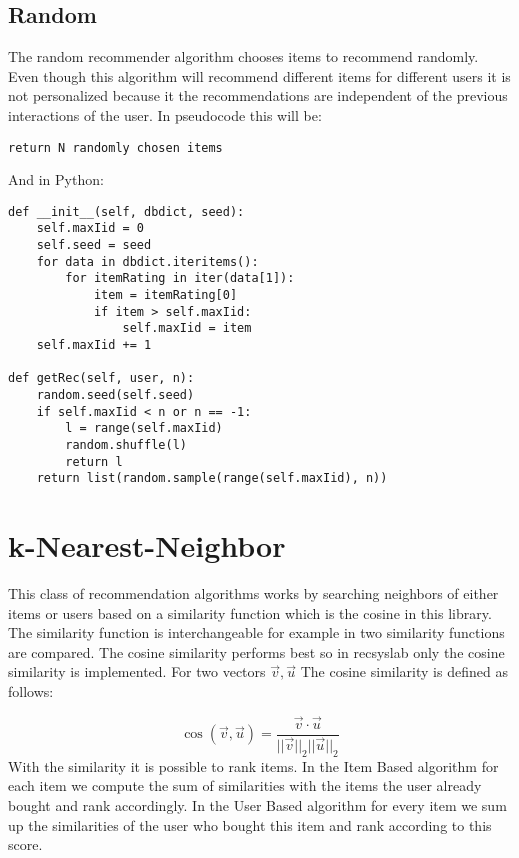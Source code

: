 \subsection{Random}

The random recommender algorithm chooses items to recommend randomly.
Even though this algorithm will recommend different items for different
users it is not personalized because it the recommendations are
independent of the previous interactions of the user.
In pseudocode this will be:
\begin{lstlisting}
return N randomly chosen items
\end{lstlisting}
And in Python:
\begin{lstlisting}
def __init__(self, dbdict, seed):
    self.maxIid = 0
    self.seed = seed
    for data in dbdict.iteritems():
        for itemRating in iter(data[1]):
            item = itemRating[0]
            if item > self.maxIid:
                self.maxIid = item
    self.maxIid += 1

def getRec(self, user, n):
    random.seed(self.seed)
    if self.maxIid < n or n == -1:
        l = range(self.maxIid)
        random.shuffle(l)
        return l
    return list(random.sample(range(self.maxIid), n))
\end{lstlisting}


\section{k-Nearest-Neighbor}

This class of recommendation algorithms works by searching neighbors
of either items or users based on a similarity function which is the
cosine in this library. The similarity function is interchangeable 
for example in
\cite{Karypis:2001:EIT:502585.502627} two similarity functions are
compared. The cosine similarity performs best so in recsyslab only the cosine similarity
is implemented. For two vectors \(\overrightarrow{v},\overrightarrow{u}\)
The cosine similarity is defined as follows:

\begin{equation}
\cos(\overrightarrow{v}, \overrightarrow{u})=\frac{\overrightarrow{v} \cdot \overrightarrow{u}}{||\overrightarrow{v}||_{2} ||\overrightarrow{u}||_{2}}
\end{equation}
With the similarity it is possible to rank items.
In the Item Based algorithm for each item we compute the sum of 
similarities with the items the user already bought and rank 
accordingly.
In the User Based algorithm for every item we sum up the 
similarities of the user who bought this item and rank
according to this score.


